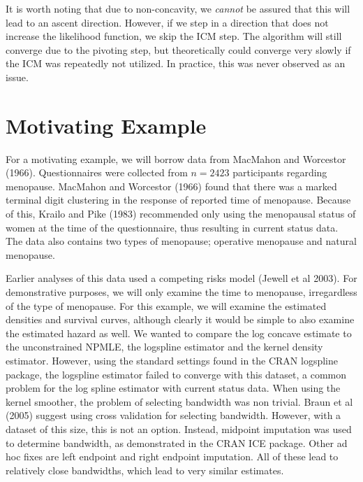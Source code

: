 \documentclass[10pt]{article}
\begin{document}
	It is worth noting that due to non-concavity, we \emph{cannot} be assured that this will lead to an ascent direction. However, if we step in a direction that does not increase the likelihood function, we skip the ICM step. The algorithm will still converge due to the pivoting step, but theoretically could converge very slowly if the ICM was repeatedly not utilized. In practice, this was never observed as an issue. 
	
	{\section{Motivating Example} }
	
	For a motivating example, we will borrow data from MacMahon and Worcestor (1966). Questionnaires were collected from $n = 2423$ participants regarding menopause. MacMahon and Worcestor (1966) found that there was a marked terminal digit clustering in the response of reported time of menopause. Because of this, Krailo and Pike (1983) recommended only using the menopausal status of women at the time of the questionnaire, thus resulting in current status data. The data also contains two types of menopause; operative menopause and natural menopause. 
	
	Earlier analyses of this data used a competing risks model (Jewell et al 2003). For demonstrative purposes, we will only examine the time to menopause, irregardless of the type of menopause. For this example, we will examine the estimated densities and survival curves, although clearly it would be simple to also examine the estimated hazard as well. We wanted to compare the log concave estimate to the unconstrained NPMLE, the logspline estimator and the kernel density estimator. However, using the standard settings found in the CRAN logspline package, the logspline estimator failed to converge with this dataset, a common problem for the log spline estimator with current status data. When using the kernel smoother, the problem of selecting bandwidth was non trivial. Braun et al (2005) suggest using cross validation for selecting bandwidth. However, with a dataset of this size, this is not an option. Instead, midpoint imputation was used to determine bandwidth, as demonstrated in the CRAN ICE package. Other ad hoc fixes are left endpoint and right endpoint imputation. All of these lead to relatively close bandwidths, which lead to very similar estimates. 
		
\end{document}
